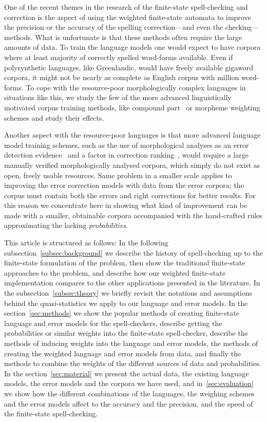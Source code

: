 \documentclass[a4paper,12pt]{article}
\begin{document}
One of the recent themes in the research of the finite-state spell-checking and
correction is the aspect of using the weighted finite-state automata to improve the
precision or the accuracy of the spelling correction---and even the checking---
methods. What is unfortunate is that these methods often require the large amounts
of data. To train the language models one would expect to have corpora where at
least majority of correctly spelled word-forms available. Even if polysynthetic
languages, like Greenlandic, would have freely available gigaword corpora,
it might not be nearly as complete as English corpus with
million word-forms. To cope with the resource-poor morphologically complex
languages in situations like this, we study the few of the more advanced
linguistically motivated corpus training methods, like compound
part~\cite[]{pirinen/2009/nodalida} or morpheme weighting schemes and study
their effects.

Another aspect with the resource-poor languages is that more advanced language
model training schemes, such as the use of morphological analyses as an error
detection evidence~\cite[]{mays/1991} and a factor in correction
ranking~\cite[]{otero/2007}, would require a large manually verified
morphologically analysed corpora, which simply do not exist as open, freely
usable resources. Same problem in a smaller scale applies to improving the
error correction models with data from the error corpora; the corpus must
contain both the errors and right corrections for better results. For this
reason we concentrate here in showing what kind of improvement can be made with
a smaller, obtainable corpora accompanied with the hand-crafted rules
approximating the lacking \emph{probabilities}.

This article is structured as follows: In the following
subsection~\ref{subsec:background} we describe the history of spell-checking up
to the finite-state formulation of the problem, then show the traditional
finite-state approaches to the problem, and describe how our weighted
finite-state implementation compares to the other applications presented in the
literature.  In the subsection~\ref{subsec:theory} we briefly revisit the
notations and assumptions behind the quasi-statistics we apply to our language
and error models.  In the section~\ref{sec:methods} we show the popular methods
of creating finite-state language and error models for the spell-checkers,
describe getting the probabilities or similar weights into the finite-state
spell-checker, describe the methods of inducing weights into the language and
error models, the methods of creating the weighted language and error models
from data, and finally the methods to combine the weights of the different
sources of data and probabilities. In the section~\ref{sec:material} we present
the actual data, the existing language models, the error models and the corpora
we have used, and in~\ref{sec:evaluation} we show how the different
combinations of the languages, the weighing schemes and the error models affect
to the accuracy and the precision, and the speed of the finite-state
spell-checking.
\end{document}

